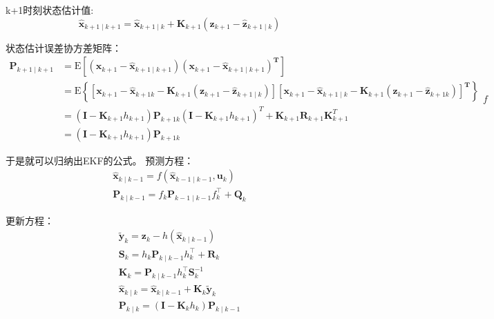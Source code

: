 \documentclass{article}
\begin{document}
 k+1时刻状态估计值: 
 \begin{equation*}
     \mathbf{\hat x}_{k+1 \mid k+1}=\mathbf{\hat x}_{k+1 \mid k}+\mathbf{K}_{k+1}\left(\mathbf{z}_{k+1}-\hat{\mathbf{z}}_{k+1 \mid k}\right)
 \end{equation*}


状态估计误差协方差矩阵：
\begin{equation*}
    \begin{aligned}
    \mathbf{P}_{k+1 \mid k+1} &=\mathrm{E}\left[\left(\mathbf{x}_{k+1}-\mathbf{\hat x}_{k+1 \mid k+1}\right)\left(\mathbf{x}_{k+1}-\mathbf{\hat x}_{k+1 \mid k+1}\right)^{\mathbf{T}}\right] \\
    &=\mathrm{E}\left\{\left[\mathbf{x}_{k+1}-\mathbf{\hat x}_{k+1 k}-\mathbf{K}_{k+1}\left(\mathbf{z}_{k+1}-\hat{\mathbf{z}}_{k+1 \mid k}\right)\right]\left[\mathbf{x}_{k+1}-\mathbf{\hat x}_{k+1 \mid k}-\mathbf{K}_{k+1}\left(\mathbf{z}_{k+1}-\hat{\mathbf{z}}_{k+1 k}\right)\right]^{\mathbf{T}}\right\} \\
    &=\left(\mathbf{I}-\mathbf{K}_{k+1} h_{k+1}\right) \mathbf{P}_{k+1 k}\left(\mathbf{I}-\mathbf{K}_{k+1} h_{k+1}\right)^{T}+\mathbf{K}_{k+1} \mathbf{R}_{k+1} \mathbf{K}_{k+1}^{T} \\
    &=\left(\mathbf{I}-\mathbf{K}_{k+1} h_{k+1}\right) \mathbf{P}_{k+1 k}
    \end{aligned}f
\end{equation*}

于是就可以归纳出EKF的公式。
预测方程：
\begin{equation*}
    \begin{array}{l}
    \hat{\mathbf{x}}_{k \mid k-1}=f\left(\hat{\mathbf{x}}_{k-1 \mid k-1}, \mathbf{u}_{k}\right) \\
    \mathbf{P}_{k \mid k-1}=f_{k} \mathbf{P}_{k-1 \mid k-1} f_{k}^{\top}+\mathbf{Q}_{k} 
    \end{array}
\end{equation*}

更新方程：
\begin{equation*}
\begin{array}{l}
\tilde{\mathbf{y}}_{k}=\mathbf{z}_{k}-h\left(\hat{\mathbf{x}}_{k \mid k-1}\right)\\
\mathbf{S}_{k}=h_{k} \mathbf{P}_{k \mid k-1} h_{k}^{\top}+\mathbf{R}_{k} \\
\mathbf{K}_{k}=\mathbf{P}_{k \mid k-1} h_{k}^{\top} \mathbf{S}_{k}^{-1} \\
\hat{\mathbf{x}}_{k \mid k}=\hat{\mathbf{x}}_{k \mid k-1}+\mathbf{K}_{k} \tilde{\mathbf{y}}_{k} \\
\mathbf{P}_{k \mid k}=\left(\mathbf{\mathbf{I}}-\mathbf{K}_{k} h_{k}\right) \mathbf{P}_{k \mid k-1}
\end{array}
\end{equation*}
\end{document}
